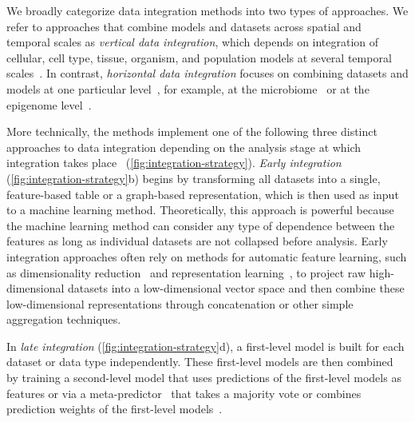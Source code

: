 \documentclass[5p]{elsarticle}
\newcommand{\rev}[1]{{\color{black}#1}}
\begin{document}
We broadly categorize data integration methods into two types of approaches.
We refer to approaches that combine models and datasets across \rev{ spatial and temporal scales as {\em vertical data integration}, which depends on integration of cellular, cell type, tissue, organism, and population models at several temporal scales~\cite{Zitnik2017ohmnet,Pilosof2017multilayer,Zitnik2016jumping}. In contrast, {\em horizontal data integration} focuses on combining datasets and models at one particular level~\cite{Bujold2016ThePortal,Libbrecht2015JointExpression}, for example, at the microbiome~\cite{Smits2017seasonal} or at the epigenome level~\cite{Kundaje2015IntegrativeEpigenomes}.}

More technically, the methods implement one of the following three distinct approaches to data integration depending on the \rev{analysis} stage at which integration takes place~\rev{\cite{Ritchie2015methods,Pavlidis2002learning,Maragos2008cross,Zitnik2015data}} (\autoref{fig:integration-strategy}).
{\em Early integration} (\autoref{fig:integration-strategy}\rev{b}) begins by transforming all datasets into a single, feature-based table or a graph-based \rev{representation, which is then used as input} to a machine learning method.
\rev{Theoretically, this approach is powerful because the machine learning method} can consider any type of dependence between the features as long as individual datasets are not collapsed \rev{before analysis}.
Early integration approaches often rely on methods for automatic feature learning, such as dimensionality reduction~\cite{Zitnik2012nimfa} and representation learning~\rev{\cite{Vincent2010stacked,Sarajlic2016graphlet,Hamilton2017review}}, to project raw high-dimensional datasets into a low-dimensional vector space and then combine these low-dimensional representations through concatenation or other simple aggregation techniques.

\rev{I}n {\em late integration} (\autoref{fig:integration-strategy}\rev{d}), a first-level model is built for each dataset or data type independently.
These first-level models are then combined by training a second-level model that uses predictions of the first-level models as features or via a meta-predictor~\cite{Yang2010review} that takes a majority vote or combines prediction weights of the first-level models~\cite{Wu2010prediction,Iam2010lce}.
\end{document}
